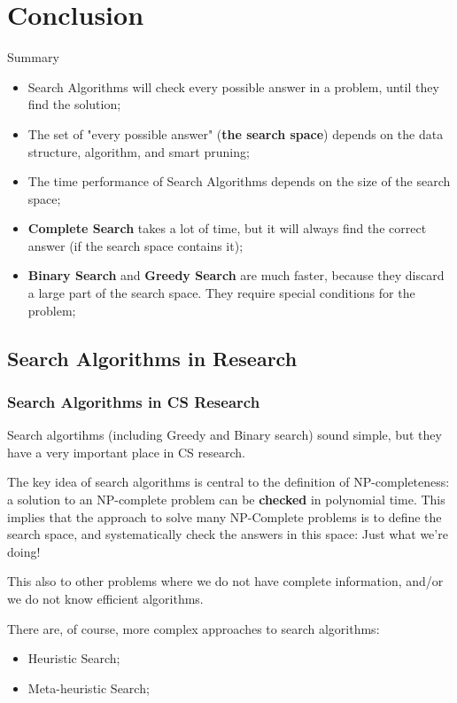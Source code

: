 \section{Conclusion}

\begin{frame}{Summary}
  \begin{itemize}
    \item Search Algorithms will check every possible answer in a problem, until they find the solution;
    \item The set of "every possible answer" ({\bf the search space}) depends on the data structure, algorithm, and smart pruning;
    \item The time performance of Search Algorithms depends on the size of the search space;
    \item {\bf Complete Search} takes a lot of time, but it will always find the correct answer (if the search space contains it);
    \item {\bf Binary Search} and {\bf Greedy Search} are much faster, because they discard a large part of the search space. They require special conditions for the problem;
  \end{itemize}
\end{frame}

\subsection{Search Algorithms in Research}

\begin{frame}
  \frametitle{Search Algorithms in CS Research}

  Search algortihms (including Greedy and Binary search) sound simple, but they have a very important place in CS research.\bigskip

  The key idea of search algorithms is central to the definition of NP-completeness: a solution to an NP-complete problem can be {\bf checked} in polynomial time. This implies that the approach to solve many NP-Complete problems is to define the search space, and systematically check the answers in this space: Just what we're doing!\bigskip

  This also to other problems where we do not have complete information, and/or we do not know efficient algorithms.\bigskip

  There are, of course, more complex approaches to search algorithms:
  \begin{itemize}
    \item Heuristic Search;
    \item Meta-heuristic Search;
  \end{itemize}
\end{frame}

